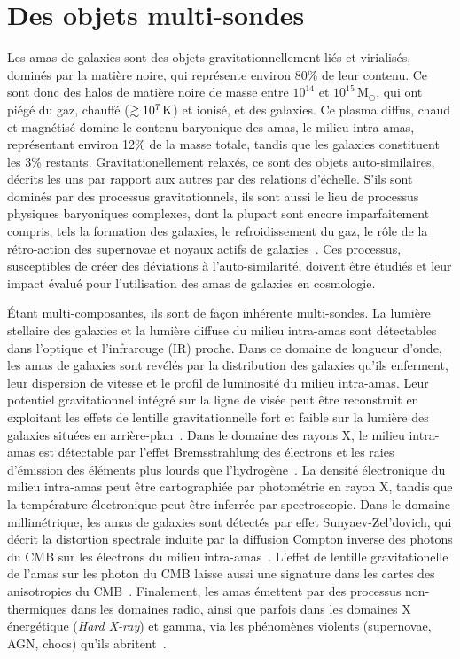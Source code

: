 \section{Des objets multi-sondes}
\label{se:multisondes}

Les amas de galaxies sont des objets gravitationnellement liés et
virialisés, dominés par la matière noire, qui représente environ 80\%
de leur contenu. Ce sont donc des halos de matière noire de
masse entre $10^{14}$ et $10^{15}$\,M$_{\odot}$, qui ont piégé du gaz,
chauffé ($\gtrsim 10^{7}\,\rm{K}$) et ionisé, et des galaxies. Ce
plasma diffus, chaud et magnétisé domine
le contenu baryonique des amas, le milieu
intra-amas, représentant environ 12\% de la masse totale, tandis que
les galaxies constituent les 3\% restants. Gravitationellement
relaxés, ce sont des objets auto-similaires, décrits les uns par
rapport aux autres par des relations d'échelle. S'ils sont dominés par
des processus gravitationnels, ils sont aussi le lieu de processus
physiques baryoniques complexes, dont la plupart sont encore
imparfaitement compris, tels la formation des galaxies, le
refroidissement du gaz, le rôle de la rétro-action des supernovae et
noyaux actifs de galaxies~\citep[voir par exemple][]{Voit2005}. Ces
processus, susceptibles de créer des déviations à l'auto-similarité,
doivent être étudiés et leur impact évalué pour l'utilisation
des amas de galaxies en cosmologie. 

\'Etant multi-composantes, ils sont de façon inhérente multi-sondes.
La lumière stellaire des galaxies et la lumière diffuse du
milieu intra-amas sont détectables dans l'optique et l'infrarouge (IR)
proche. Dans ce domaine de longueur d'onde, les amas de galaxies sont
revélés par la distribution des galaxies qu'ils enferment, leur
dispersion de vitesse et le profil de luminosité du milieu
intra-amas. Leur potentiel gravitationnel intégré sur la ligne de
visée peut être reconstruit en exploitant les effets de lentille
gravitationnelle fort et faible sur la lumière des galaxies situées en
arrière-plan~\citep[ pour une revue]{Bartelmann2010}. Dans le domaine des
rayons X, le milieu intra-amas est détectable par l'effet Bremsstrahlung des
électrons et les raies d'émission des éléments plus lourds que
l'hydrogène~\citep{Sarazin1986}. La densité électronique du milieu intra-amas peut être
cartographiée par photométrie en rayon X, tandis que la température
électronique peut être inferrée par spectroscopie. Dans le domaine
millimétrique, les amas de galaxies sont détectés par effet
Sunyaev-Zel'dovich, qui décrit la distortion spectrale induite par la
diffusion Compton inverse des photons du CMB sur les électrons du milieu
intra-amas~\citep{SZ1970}.
L'effet de lentille gravitationelle de l'amas sur les photon du CMB
laisse aussi une signature dans les cartes des anisotropies du
CMB~\citep{Seljak2000}. Finalement, les amas émettent par des
processus non-thermiques dans les domaines radio, ainsi que parfois
dans les domaines X énergétique (\emph{Hard X-ray}) et gamma, via les
phénomènes violents (supernovae, AGN, chocs) qu'ils
abritent~\citep{Rephaeli2008}.


